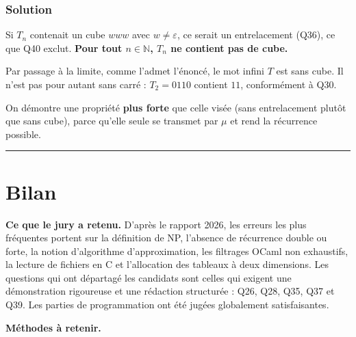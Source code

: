 \documentclass[11pt,a4paper]{article}
\begin{document}
\hypertarget{solution-40}{%
\subsubsection{Solution}\label{solution-40}}

Si \(T_n\) contenait un cube \(www\) avec \(w\ne\varepsilon\), ce serait un entrelacement (Q36), ce que Q40 exclut. \textbf{Pour tout \(n\in\mathbb N\), \(T_n\) ne contient pas de cube.}

Par passage à la limite, comme l'admet l'énoncé, le mot infini \(T\) est sans cube. Il n'est pas pour autant sans carré : \(T_2=0110\) contient \(11\), conformément à Q30.

\begin{methode}

On démontre une propriété \textbf{plus forte} que celle visée (sans entrelacement plutôt que sans cube), parce qu'elle seule se transmet par \(\mu\) et rend la récurrence possible.

\end{methode}

\begin{center}\rule{0.5\linewidth}{0.5pt}\end{center}

\hypertarget{bilan}{%
\section{Bilan}\label{bilan}}

\textbf{Ce que le jury a retenu.} D'après le rapport 2026, les erreurs les plus fréquentes portent sur la définition de NP, l'absence de récurrence double ou forte, la notion d'algorithme d'approximation, les filtrages OCaml non exhaustifs, la lecture de fichiers en C et l'allocation des tableaux à deux dimensions. Les questions qui ont départagé les candidats sont celles qui exigent une démonstration rigoureuse et une rédaction structurée : Q26, Q28, Q35, Q37 et Q39. Les parties de programmation ont été jugées globalement satisfaisantes.

\textbf{Méthodes à retenir.}
\end{document}

